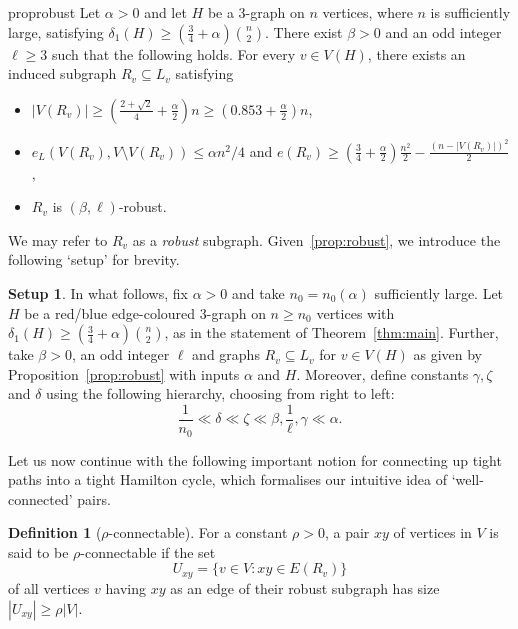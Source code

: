 \documentclass[A4paper,12pt]{article}
\theoremstyle{definition}
\newtheorem{define}[thm]{Definition}
\newtheorem{setup}[thm]{Setup}
\begin{document}
\begin{restatable}{prop}{robust}
\label{prop:robust} Let $\alpha > 0$ and let $H$ be a 3-graph on $n$ vertices, where $n$ is sufficiently large, satisfying $\delta_1(H) \geq (\frac{3}{4} + \alpha)\binom{n}{2}$. There exist $\beta>0$ and an odd integer $\ell\geq 3$ such that the following holds. For every $v \in V(H)$, there exists an induced subgraph $R_v\subseteq L_v$ satisfying 
\begin{itemize}
\item[(i)] $|V(R_v)|\geq \left(\frac{2+\sqrt{2}}{4} +\frac{\alpha}{2}\right)n \ge \left(0.853 +\frac{\alpha}{2}\right)n$,
\item[(ii)] $e_L(V(R_v),V\setminus V(R_v))\leq \alpha n^2/4$ and $e(R_v)\geq \left(\frac{3}{4}+\frac{\alpha}{2}\right)\frac{n^2}{2}-\frac{(n-|V(R_v)|)^2}{2}$,
\item[(iii)] $R_v$ is $(\beta,\ell)$-robust. 
\end{itemize}
\end{restatable}
We may refer to $R_v$ as a \emph{robust} subgraph. Given~\cref{prop:robust}, we introduce the following `setup' for brevity.
\begin{setup} \label{setup} In what follows, 
fix $\alpha > 0$ and take $n_0 = n_0(\alpha)$ sufficiently large. Let $H$ be a red/blue edge-coloured 3-graph  on $n \ge n_0$ vertices with $\delta_1(H) \geq (\frac{3}{4} + \alpha)\binom{n}{2}$, as in the statement of Theorem~\ref{thm:main}. Further, take $\beta > 0$, an odd integer $\ell$ and graphs $R_v \subseteq L_v$ for $v \in V(H)$ as given by Proposition~\ref{prop:robust} with inputs $\alpha$ and $H$. Moreover, define constants $\gamma, \zeta$ and $\delta$ using the following hierarchy, choosing from right to left:\begin{equation}\label{eq:hierarchy} 
\frac{1}{n_0} \ll \delta \ll \zeta \ll \beta, \frac{1}{\ell}, \gamma \ll \alpha.
\end{equation} 


\end{setup}

Let us now continue with the following important notion for connecting up tight paths into a tight Hamilton cycle, which formalises our intuitive idea of `well-connected' pairs. 

\begin{define}[$\rho$-connectable]\label{def:connectable}
    For a constant $\rho > 0$, a pair $xy$ of vertices in $V$ is said to be $\rho$-connectable if the set $$U_{xy} = \{v \in V: xy \in E(R_v)\}$$ of all vertices $v$ having $xy$ as an edge of their robust subgraph has size $|U_{xy}| \geq \rho|V|$.
\end{define}
\end{document}
